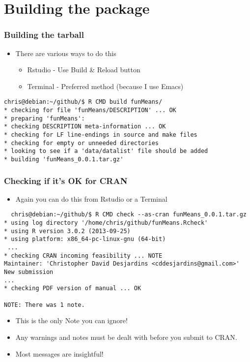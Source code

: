 \documentclass[xcolor=svgnames]{beamer}
\begin{document}
\section{Building the package}

\begin{frame}[fragile]
\frametitle{Building the tarball}
   \begin{itemize}
  \item There are various ways to do this
     \begin{itemize}
     \item Rstudio - Use Build \& Reload button
     \item Terminal - Preferred method (because I use Emacs)
     \end{itemize}
  \end{itemize}

  \begin{scriptsize}
  \begin{verbatim}
chris@debian:~/github/$ R CMD build funMeans/
* checking for file 'funMeans/DESCRIPTION' ... OK
* preparing 'funMeans':
* checking DESCRIPTION meta-information ... OK
* checking for LF line-endings in source and make files
* checking for empty or unneeded directories
* looking to see if a 'data/datalist' file should be added
* building 'funMeans_0.0.1.tar.gz'

 \end{verbatim}
\end{scriptsize}
\end{frame}

\begin{frame}[fragile]
\frametitle{Checking if it's OK for CRAN}  
\begin{itemize}
  \item Again you can do this from Rstudio or a Terminal
\end{itemize}
    \begin{scriptsize}
\begin{verbatim}
  chris@debian:~/github/$ R CMD check --as-cran funMeans_0.0.1.tar.gz
* using log directory '/home/chris/github/funMeans.Rcheck'
* using R version 3.0.2 (2013-09-25)
* using platform: x86_64-pc-linux-gnu (64-bit)
 ...
* checking CRAN incoming feasibility ... NOTE
Maintainer: 'Christopher David Desjardins <cddesjardins@gmail.com>'
New submission
...
* checking PDF version of manual ... OK

NOTE: There was 1 note.
\end{verbatim}
\end{scriptsize}
\begin{itemize}
  \item This is the only Note you can ignore!
    \item Any warnings and notes must be dealt with before you submit to CRAN.
      \item Most messages are insightful!
\end{itemize}
\end{frame}
\end{document}
